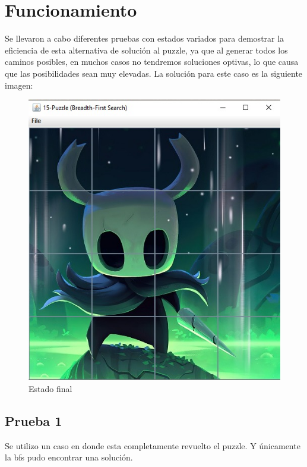 \section{Funcionamiento}
    Se llevaron a cabo diferentes pruebas con estados variados para demostrar la eficiencia de esta alternativa de solución al puzzle, ya que al generar todos los caminos posibles, en muchos casos no tendremos soluciones optivas, lo que causa que las posibilidades sean muy elevadas. La solución para este caso es la siguiente imagen:

    \begin{figure}[!h]
        \centering
        \includegraphics[scale=.4]{Imagenes/final.jpg}
        \caption{Estado final}
        \label{fig:my_label}
    \end{figure}

    \subsection{Prueba 1}
        Se utilizo un caso en donde esta completamente revuelto el puzzle. Y únicamente la bfs pudo encontrar una solución.
        
